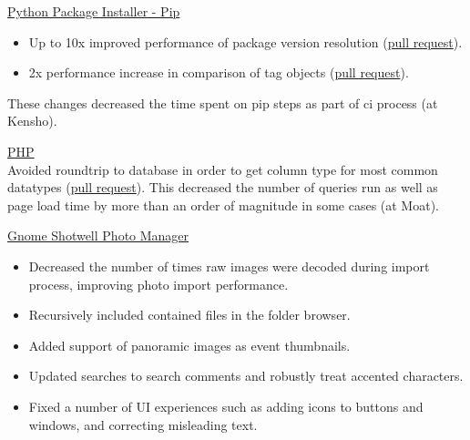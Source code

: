 \myfontsize{\littleheader}
\href{https://github.com/pypa/pip}{Python Package Installer - Pip}\\
\myfontsize{\bodysize}

\begin{itemize}[topsep=1ex, partopsep=0ex, parsep=0ex, itemsep=0.4ex]
    \item Up to 10x improved performance of package version resolution (\href{https://github.com/pypa/pip/pull/9748}{pull request}).
    \item 2x performance increase in comparison of tag objects (\href{https://github.com/pypa/packaging/pull/417}{pull request}).
\end{itemize}
These changes decreased the time spent on pip steps as part of ci process (at Kensho).

\vspace{\littleskip}
\vspace{\littleskip}

\myfontsize{\littleheader}
\href{https://github.com/php/php-src}{PHP}\\
\myfontsize{\bodysize}
Avoided roundtrip to database in order to get column type for most common datatypes (\href{https://github.com/php/php-src/pull/1534}{pull request}).
This decreased the number of queries run as well as page load time by more than an order of magnitude in some cases (at Moat).

\vspace{\littleskip}
\vspace{\littleskip}

\myfontsize{\littleheader}
\href{https://gitlab.gnome.org/GNOME/shotwell}{Gnome Shotwell Photo Manager}\\
\myfontsize{\bodysize}
\begin{itemize}[topsep=1ex, partopsep=0ex, parsep=0ex, itemsep=0.4ex]
    \item Decreased the number of times raw images were decoded during import process, improving photo import performance.
    \item Recursively included contained files in the folder browser.
    \item Added support of panoramic images as event thumbnails.
    \item Updated searches to search comments and robustly treat accented characters.
    \item Fixed a number of UI experiences such as adding icons to buttons and windows, and correcting misleading text.
\end{itemize}


